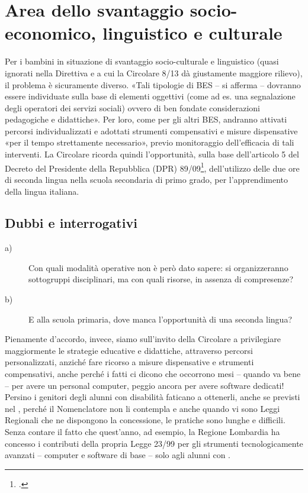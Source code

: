\section*{Area dello svantaggio socio-economico, linguistico e culturale}
Per i bambini in situazione di svantaggio socio-culturale e linguistico (quasi ignorati nella Direttiva e a cui la Circolare 8/13 dà giustamente maggiore rilievo), il problema è sicuramente diverso. «Tali tipologie di BES – si afferma – dovranno essere individuate sulla base di elementi oggettivi (come ad es. una segnalazione degli operatori dei servizi sociali) ovvero di ben fondate considerazioni pedagogiche e didattiche». Per loro, come per gli altri BES, andranno attivati percorsi individualizzati e adottati strumenti compensativi e misure dispensative «per il tempo strettamente necessario», previo monitoraggio dell'efficacia di tali interventi.
La Circolare ricorda quindi l'opportunità, sulla base dell'articolo 5 del Decreto del Presidente della Repubblica (DPR) 89/09\footcite{DPR_89_2009}, dell'utilizzo delle due ore di seconda lingua nella scuola secondaria di primo grado, per l'apprendimento della lingua italiana.
\subsection*{Dubbi e interrogativi}
\begin{description}
	\item[a)]  Con quali modalità operative non è però dato sapere: si organizzeranno sottogruppi disciplinari, ma con quali risorse, in assenza di compresenze?
	\item [b)]E alla scuola primaria, dove manca l’opportunità di una seconda lingua?
\end{description}
Pienamente d'accordo, invece, siamo sull'invito della Circolare a privilegiare maggiormente le strategie educative e didattiche, attraverso percorsi personalizzati, anziché fare ricorso a misure dispensative e strumenti compensativi, anche perché i fatti ci dicono che occorrono mesi – quando va bene – per avere un personal computer, peggio ancora per avere software dedicati! Persino i genitori degli alunni con disabilità faticano a ottenerli, anche se previsti nel , perché il Nomenclatore non li contempla e anche quando vi sono Leggi Regionali che ne dispongono la concessione, le pratiche sono lunghe e difficili. Senza contare il fatto che quest'anno, ad esempio, la Regione Lombardia ha concesso i contributi della propria Legge 23/99 per gli strumenti tecnologicamente avanzati – computer e software di base – solo agli alunni con .

